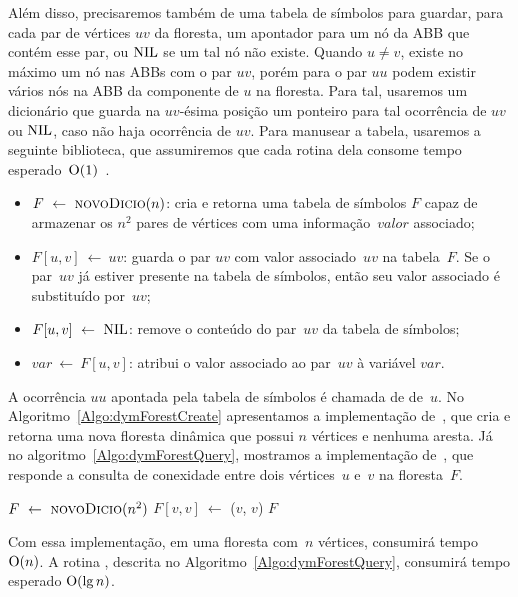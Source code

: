 Além disso, precisaremos também de uma tabela de símbolos para guardar, para cada par de vértices $uv$ da floresta, um apontador para um nó da ABB que contém esse par, ou $\text{NIL}$ se um tal nó não existe. Quando $ u\neq v$, existe no máximo um nó nas ABBs com o par $uv$, porém para o par $uu$ podem existir vários nós na ABB da componente de $u$ na floresta. Para tal, usaremos um dicionário que guarda na $uv$-ésima posição um ponteiro para tal ocorrência de $uv$ ou $\text{NIL}$, caso não haja ocorrência de $uv$. Para manusear a tabela, usaremos a seguinte biblioteca, que assumiremos que cada rotina dela consome tempo esperado~$\mathrm{O}(1)$~\cite{CLRS}.
\begin{itemize}
    \item $F~\gets~\text{\scshape novoDicio}(n)$: cria e retorna uma tabela de símbolos $F$ capaz de armazenar os $n^2$ pares de vértices com uma informação~$valor$ associado;
    \item $F[u,v]~\gets~uv$: guarda o par $uv$ com valor associado~$uv$ na tabela~$F$. Se o par~$uv$ já estiver presente na tabela de símbolos, então seu valor associado é substituído por~$uv$;
    \item $F[u,v]~\gets~\text{NIL}{}$: remove o conteúdo do par~$uv$ da tabela de símbolos;
    \item $var~\gets~F[u,v]$: atribui o valor associado ao par~$uv$ à variável $var$.
\end{itemize}

A ocorrência $uu$ apontada pela tabela de símbolos é chamada de  de~$u$.
No Algoritmo~\ref{Algo:dymForestCreate} apresentamos a implementação de~\dymForestCreate{}, que cria e retorna uma nova floresta dinâmica que possui $n$ vértices e nenhuma aresta.
Já no algoritmo~\ref{Algo:dymForestQuery}, mostramos a implementação de~\dymForestQuery{}, que responde a consulta de conexidade entre dois vértices~$u$ e~$v$ na floresta~$F$.


\begin{algorithm}[htb]
\caption{\dymForestCreate($n$)}
\label{Algo:dymForestCreate}
\begin{algorithmic}[1]
\State $F~\gets~\text{\scshape novoDicio}(n^2)$
\label{Algo:dymForestCreate:for}
\State $F[v,v]~\gets$ \treapCreate($v$, $v$)
\EndFor
\State \Return $F$
\end{algorithmic}
\end{algorithm}

Com essa implementação, em uma floresta com~$n$ vértices, \dymForestCreate{} consumirá tempo~$\mathrm{O}(n)$. A rotina \dymForestQuery{}, descrita no Algoritmo~\ref{Algo:dymForestQuery}, consumirá tempo esperado $\mathrm{O}(\lg n)$.



